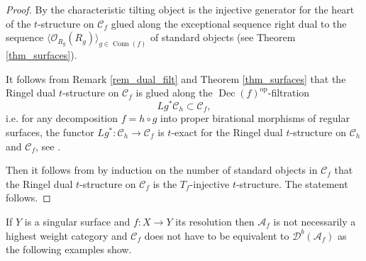 \documentclass[12pt,a4paper]{amsart}
\newcommand{\f}{\varphi}
\newcommand{\cC}{{\mathcal{C}}}
\newcommand{\dD}{{\mathcal{D}}}
\newcommand{\oO}{{\mathcal{O}}}
\newcommand{\tr}{{\mbox{$t$-struc}\-tu\-r}}
\newcommand{\Dec}{\mathop{\operatorname{Dec}}\nolimits}
\newcommand{\Conn}{\mathop{\textrm{Conn}}\nolimits}
\newcommand{\opp}{\mathop{\textrm{op}}\nolimits}
\theoremstyle{definition}
\begin{document}
\begin{proof}
By \cite[Section 6.1]{BodBon5} the characteristic tilting object is the injective generator for the heart of the \tr e on $\cC_f$ glued along the exceptional sequence right dual to the sequence $\langle \oO_{R_g}(R_g) \rangle_{g\in \Conn(f)}$ of standard objects (see Theorem \ref{thm_surfaces}). 

It follows from Remark \ref{rem_dual_filt} and Theorem \ref{thm_surfaces}  that the Ringel dual \tr e on $\cC_f$ is glued along the $\Dec(f)^{\opp}$-filtration
$$
Lg^* \cC_h \subset \cC_f, 
$$
i.e. for any decomposition $f= h \circ g$ into proper birational morphisms of regular surfaces, the functor $Lg^* \colon \cC_h \to \cC_f$ is $t$-exact for the Ringel dual \tr e on $\cC_h$ and $\cC_f$, see \cite{BodBon2}.

%
%

Then it follows from \cite[Proposition 5.14]{BodBon2} by induction on the number of standard objects in $\cC_f$ that the Ringel dual \tr e on $\cC_f$ is the $T_f$-injective \tr e. The statement follows.  
\end{proof}

If $Y$ is a singular surface and $f\colon X\to Y$ its resolution then $\mathscr{A}_f$ is not necessarily a highest weight category and $\cC_f$ does not have to be equivalent to $\dD^b(\mathscr{A}_f)$ as the following examples show.
\end{document}
